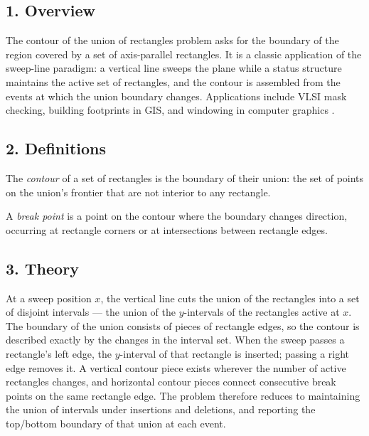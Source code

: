 \subsection{1. Overview}

The contour of the union of rectangles problem
asks for the boundary of the region covered by a set of axis-parallel
rectangles. It is a classic application of the sweep-line paradigm: a
vertical line sweeps the plane while a status structure maintains the
active set of rectangles, and the contour is assembled from the events at
which the union boundary changes. Applications include VLSI mask checking,
building footprints in GIS, and windowing in computer graphics
\cite{berg2008}.

\subsection{2. Definitions}

\begin{definition}\label{def:union_contour}
  The \emph{contour} of a set of rectangles is the boundary of their union:
  the set of points on the union's frontier that are not interior to any
  rectangle.
\end{definition}

\begin{definition}\label{def:contour_break_point}
  A \emph{break point} is a point on the contour where the boundary changes
  direction, occurring at rectangle corners or at intersections between
  rectangle edges.
\end{definition}

\subsection{3. Theory}

At a sweep position $x$, the vertical line cuts the union of the rectangles
into a set of disjoint intervals --- the union of the $y$-intervals of the
rectangles active at $x$. The boundary of the union consists of pieces of
rectangle edges, so the contour is described exactly by the changes in the
interval set. When the sweep passes a rectangle's left edge, the
$y$-interval of that rectangle is inserted; passing a right edge removes it.
A vertical contour piece exists wherever the number of active rectangles
changes, and horizontal contour pieces connect consecutive break points on
the same rectangle edge. The problem therefore reduces to maintaining the
union of intervals under insertions and deletions, and reporting the
top/bottom boundary of that union at each event.

